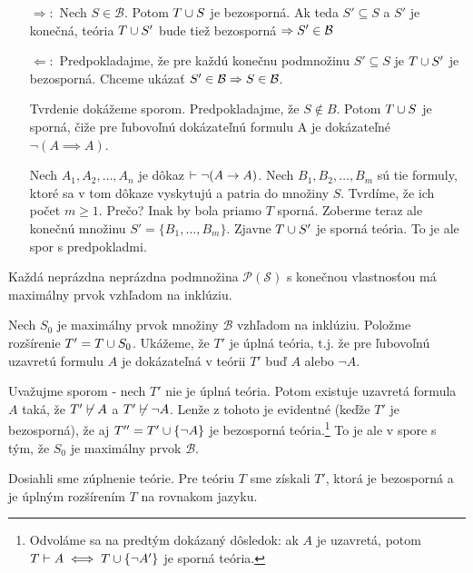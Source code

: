 \begin{dokaz}
   \begin{itemize}
       \item[$\Rightarrow:$]
            Nech $S \in \mathcal{B}$. Potom $T \cup S$ je bezosporná.
            Ak teda $S' \subseteq S$ a  $S'$ je konečná, teória 
            $T \cup S'$ bude tiež bezosporná $\Rightarrow S' \in \mathcal{B}$
        \item[$\Leftarrow:$]
            Predpokladajme, že pre každú konečnu podmnožinu $S' \subseteq S$
            je $T \cup S'$ je bezosporná.
            Chceme ukázať $S' \in \mathcal{B} \Rightarrow S \in \mathcal{B}$.

            Tvrdenie dokážeme sporom.
            Predpokladajme, že $S \not \in B$.
            Potom $T \cup S$ je sporná,
            čiže pre ľubovoľnú dokázateľnú formulu A je dokázateľné
            $\neg(A \implies A)$.

            Nech $A_1, A_2, \dots, A_n$ je dôkaz 
                $\vdash \neg(A \rightarrow A)$.
            Nech $B_1, B_2, \dots, B_m$ sú tie formuly,
            ktoré sa v tom dôkaze vyskytujú a patria do množiny $S$.
            Tvrdíme, že ich počet $m \ge 1$.
            Prečo? Inak by bola priamo $T$ sporná.
            Zoberme teraz ale konečnú množinu $S'=\{B_1, \dots, B_m\}$.
            Zjavne $T \cup S'$ je sporná teória.
            To je ale spor s predpokladmi.
    \end{itemize}

    \begin{lema}
        Každá neprázdna neprázdna podmnožina $\mathcal{P}(\mathscr{S})$ s konečnou vlastnosťou 
        má maximálny prvok vzhľadom na inklúziu.
    \end{lema}

    Nech $S_0$ je maximálny prvok množiny $\mathcal{B}$ vzhľadom na inklúziu.
    Položme rozšírenie $T' = T \cup S_0$. Ukážeme, že $T'$ je úplná
    teória, t.j. že pre ľubovoľnú uzavretú formulu $A$ je dokázateľná
    v teórii $T'$ buď $A$ alebo $\neg A$.

    Uvažujme sporom - nech $T'$ nie je úplná teória. 
    Potom existuje uzavretá formula $A$ taká,
    že $T'\not \vdash A$ a $T' \not \vdash \neg A$.
    Lenže z tohoto je evidentné (keďže $T'$ je bezosporná), že aj
    $T'' = T' \cup \{\neg A\}$ je bezosporná teória.\footnote{
        Odvoláme sa na predtým dokázaný dôsledok: ak $A$ je uzavretá,
        potom $T \vdash A \iff T \cup \{\neg A'\}$ je sporná teória.
    }
    To je ale v spore s tým, že $S_0$ je maximálny prvok $\mathcal{B}$.

    Dosiahli sme zúplnenie teórie. Pre teóriu $T$ sme získali $T'$,
    ktorá je bezosporná a je úplným rozšírením $T$ na rovnakom jazyku.
\end{dokaz}

